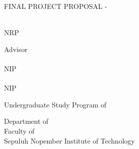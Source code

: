\begin{large}
  FINAL PROJECT PROPOSAL - \coursecode{}
\end{large}

\vspace{\fill}

\begin{spacing}{1.5}
  \begin{Large}
    \engtatitle{}
  \end{Large}
\end{spacing}

\vspace{\fill}

\begin{large}
  \name{} \\
  \textmd{NRP \nrp{}}
\end{large}

\vspace{\fill}

\begin{large}
  \textmd{Advisor} \\
  \advisor{} \\
  \textmd{NIP \advisornip{}} \\
  \coadvisor{} \\
  \textmd{NIP \coadvisornip{}}
\end{large}

\vspace{\fill}

Undergraduate Study Program of \studyprogram{} \\

\mdseries

Department of \department{} \\
Faculty of \faculty{} \\
Sepuluh Nopember Institute of Technology

\place{} \\
\the\year{}

